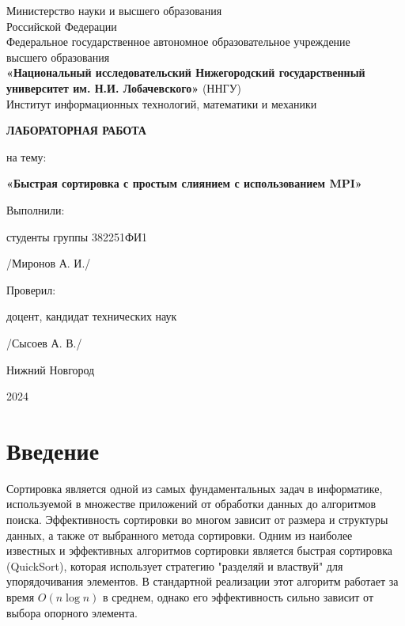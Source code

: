\documentclass[12pt]{article}
\begin{document}
\begin{titlepage}
    \centering
    {\small 
    Министерство науки и высшего образования \\
    Российской Федерации \\
    Федеральное государственное автономное образовательное учреждение \\
    высшего образования \\
    \textbf{«Национальный исследовательский Нижегородский государственный университет им. Н.И. Лобачевского»} (ННГУ) \\
    Институт информационных технологий, математики и механики \par
    }
    \vspace{3cm}
    \textbf{\Large ЛАБОРАТОРНАЯ РАБОТА} \par
    \vspace{0.5cm}
    на тему: \par
    \textbf{«Быстрая сортировка с простым слиянием с использованием MPI»} \par
    \vspace{3cm}
    \hspace{0.5cm} \par
    \begin{flushright}
    Выполнили: \par
    студенты группы 382251ФИ1 \par
    \underline{\hspace{5cm}} /Миронов А. И./ \par
    \vspace{1cm}
    Проверил: \par
    доцент, кандидат технических наук \par
    \underline{\hspace{5cm}} /Сысоев А. В./ \par
    \end{flushright}
    \vfill
    \centering
    Нижний Новгород \par
    2024
\end{titlepage}

\tableofcontents
\newpage

\section*{Введение}
\indent Сортировка является одной из самых фундаментальных задач в информатике, используемой в множестве приложений от обработки данных до алгоритмов поиска. Эффективность сортировки во многом зависит от размера и структуры данных, а также от выбранного метода сортировки. Одним из наиболее известных и эффективных алгоритмов сортировки является быстрая сортировка (QuickSort), которая использует стратегию "разделяй и властвуй" для упорядочивания элементов. В стандартной реализации этот алгоритм работает за время $ O(n \log n) $ в среднем, однако его эффективность сильно зависит от выбора опорного элемента.
\end{document}
